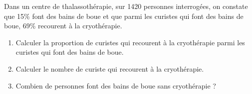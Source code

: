 
Dans un centre de thalassothérapie, sur 1420 personnes interrogées, on constate que 15\% font des bains de boue et que parmi les curistes qui font des bains de boue, 69\% recourent à la cryothérapie.
 


\begin{enumerate}
\item Calculer la proportion de curistes qui recourent à la cryothérapie parmi les curistes qui font des bains de boue.
\item Calculer le nombre de curiste qui recourent à la cryothérapie.
\item Combien de personnes font des bains de boue  sans cryothérapie ? 
\end{enumerate} 